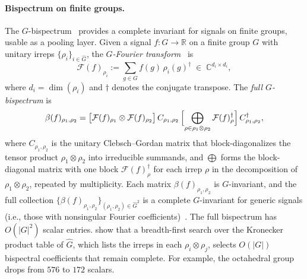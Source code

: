 \documentclass{article}
\theoremstyle{definition}
\theoremstyle{remark}
\newcommand{\R}{\mathbb{R}}
\newcommand{\C}{\mathbb{C}}
\theoremstyle{definition}
\begin{document}
\paragraph{Bispectrum on finite groups.}
The $G$-bispectrum~\citep{kakarala1992triple, mataigne2024selective}
provides a complete invariant for signals on finite
groups, usable as a pooling layer. Given a signal $f : G \to \R$ on a finite group $G$ with
unitary irreps $\{\rho_i\}_{i\in\hat{G}}$, the \emph{$G$-Fourier
transform}~\citep{diaconis1990fourier} is
\begin{equation}\label{eq:fourier-finite}
  \mathcal{F}(f)_{\rho_i}
  := \sum_{g \in G} f(g)\, \rho_i(g)^{\dagger}
  \;\in\; \C^{d_i \times d_i},
\end{equation}
where $d_i = \dim(\rho_i)$ and $\dagger$ denotes the conjugate transpose. The \emph{full
$G$-bispectrum} is
\begin{equation}\label{eq:bispectrum-def}
  \beta(f)_{\rho_1,\rho_2}
  = \bigl[\mathcal{F}(f)_{\rho_1} \otimes
    \mathcal{F}(f)_{\rho_2}\bigr]\,
    C_{\rho_1,\rho_2}\,
    \Bigl[\bigoplus_{\rho \in \rho_1 \otimes \rho_2}
      \mathcal{F}(f)_{\rho}^{\dagger}\Bigr]\,
    C_{\rho_1,\rho_2}^{\dagger},
\end{equation}
where $C_{\rho_1,\rho_2}$ is the unitary Clebsch--Gordan matrix that
block-diagonalizes the tensor product $\rho_1 \otimes \rho_2$ into
irreducible summands, and $\bigoplus$ forms the block-diagonal matrix with one block
$\mathcal{F}(f)_\rho^\dagger$ for each irrep $\rho$ in the decomposition of
$\rho_1\otimes\rho_2$, repeated by multiplicity. Each matrix
$\beta(f)_{\rho_1,\rho_2}$ is $G$-invariant, and the full collection
$\{\beta(f)_{\rho_1,\rho_2}\}_{(\rho_1,\rho_2)\in\hat{G}^2}$
is a complete $G$-invariant for generic signals (i.e., those with
nonsingular Fourier coefficients)~\citep{kakarala1992triple}.
The full bispectrum has $O(|G|^2)$ scalar entries.
\citet{mataigne2024selective} show that a breadth-first search over
the Kronecker product table of $\hat{G}$, which lists the irreps in each
$\rho_i\otimes\rho_j$, selects $O(|G|)$ bispectral
coefficients that remain complete. For example, the octahedral group
drops from $576$ to $172$ scalars.
\end{document}
